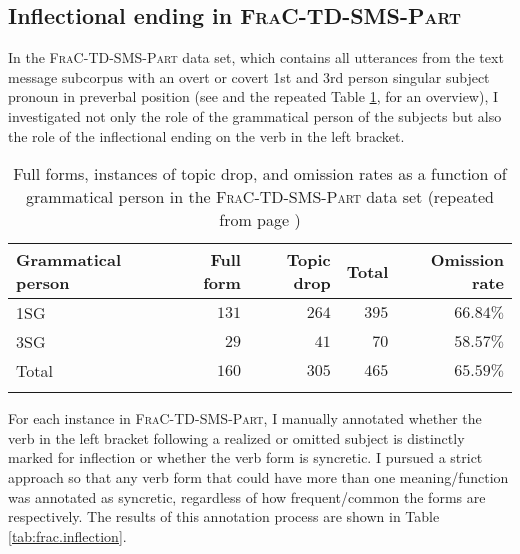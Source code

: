 \subsection{Inflectional ending in \textsc{FraC-TD-SMS-Part}}\label{sec:frac.td.sms.part.inflection} 
In the \textsc{FraC-TD-SMS-Part} data set, which contains all utterances from the text message subcorpus with an overt or covert 1st and 3rd person singular subject pronoun in preverbal position (see  and the repeated Table \ref{tab:frac.td.mess.part.rep}, for an overview), I investigated not only the role of the grammatical person of the subjects but also the role of the inflectional ending on the verb in the left bracket.

\begin{table}
\centering
\caption{Full forms, instances of topic drop, and omission rates as a function of grammatical person in the \textsc{FraC-TD-SMS-Part} data set (repeated from page \pageref{tab:frac.td.mess.part})}
\begin{tabular}{lrrrr}
\lsptoprule
Grammatical person & Full form & Topic drop & Total & Omission rate\\
\midrule
1SG & $131$ & $264$ & $395$ & $66.84\%$\\
3SG & $29$ & $41$ & $70$ & $58.57\%$\\
\tablevspace
Total & $160$ & $305$ & $465$ & $65.59\%$\\
\lspbottomrule
\end{tabular}
\label{tab:frac.td.mess.part.rep}
\end{table}

\noindent
For each instance in \textsc{FraC-TD-SMS-Part}, I manually annotated whether the verb in the left bracket following a realized or omitted subject is distinctly marked for inflection or whether the verb form is syncretic.
I pursued a strict approach so that any verb form that could have more than one meaning/function was annotated as syncretic, regardless of how frequent/common the forms are respectively.
The results of this annotation process are shown in Table \ref{tab:frac.inflection}.

